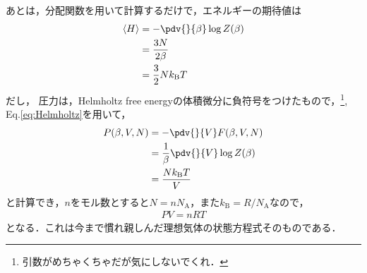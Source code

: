 	あとは，分配関数を用いて計算するだけで，エネルギーの期待値は
	\begin{align}
			\langle H \rangle &= -\pdv{}{\beta}\log Z(\beta)\\
							  &= \frac{3N}{2\beta}\\
							  &= \frac{3}{2}Nk_{\text{B}}T
	\end{align}
	だし，
	圧力は，Helmholtz free energyの体積微分に負符号をつけたもので，\footnote{引数がめちゃくちゃだが気にしないでくれ．}, Eq.\eqref{eq:Helmholtz}を用いて，
	\begin{align}
			P(\beta, V, N) &= -\pdv{}{V}F(\beta, V, N)\\
						   &= \frac{1}{\beta}\pdv{}{V}\log Z(\beta)\\
						   &=\frac{Nk_{\text{B}}T}{V}
	\end{align}
	と計算でき，$n$をモル数とすると$N=nN_{\text{A}}$，また$k_{\text{B}} = R/N_{\text{A}}$なので，
	\begin{align}
			PV = nRT
	\end{align}
	となる．これは今まで慣れ親しんだ理想気体の状態方程式そのものである．





